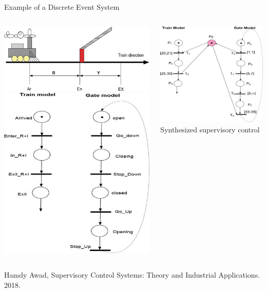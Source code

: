 \documentclass[10pt,dvipsnames]{beamer}
\begin{document}
\begin{frame}{Example of a Discrete Event System}
\begin{columns}
  \begin{column}{0.5\linewidth}\centering
\includegraphics[width=0.8\linewidth]{train.png}
\includegraphics[width=0.8\linewidth]{no-control.png}
\end{column}
\begin{column}{0.5\linewidth}\centering
  \includegraphics[width=0.8\linewidth]{controlled.png}
  Synthesized supervisory control
\end{column}
\end{columns}
\vfill
\noindent Hamdy Awad, Supervisory Control Systems: Theory and Industrial Applications. 2018. 
\end{frame}
\end{document}
